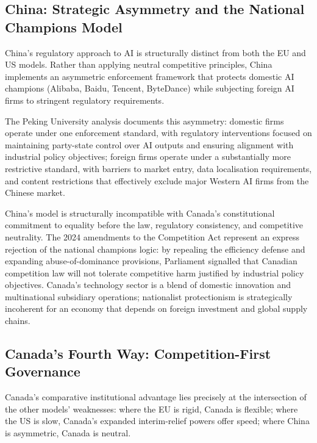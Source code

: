 \subsection{China: Strategic Asymmetry and the National Champions Model}

China's regulatory approach to AI is structurally distinct from both the EU and US models. Rather than applying neutral competitive principles, China implements an asymmetric enforcement framework that protects domestic AI champions (Alibaba, Baidu, Tencent, ByteDance) while subjecting foreign AI firms to stringent regulatory requirements.

The Peking University analysis documents this asymmetry: domestic firms operate under one enforcement standard, with regulatory interventions focused on maintaining party-state control over AI outputs and ensuring alignment with industrial policy objectives; foreign firms operate under a substantially more restrictive standard, with barriers to market entry, data localisation requirements, and content restrictions that effectively exclude major Western AI firms from the Chinese market.

China's model is structurally incompatible with Canada's constitutional commitment to equality before the law, regulatory consistency, and competitive neutrality. The 2024 amendments to the Competition Act represent an express rejection of the national champions logic: by repealing the efficiency defense and expanding abuse-of-dominance provisions, Parliament signalled that Canadian competition law will not tolerate competitive harm justified by industrial policy objectives. Canada's technology sector is a blend of domestic innovation and multinational subsidiary operations; nationalist protectionism is strategically incoherent for an economy that depends on foreign investment and global supply chains.

\subsection{Canada's Fourth Way: Competition-First Governance}

Canada's comparative institutional advantage lies precisely at the intersection of the other models' weaknesses: where the EU is rigid, Canada is flexible; where the US is slow, Canada's expanded interim-relief powers offer speed; where China is asymmetric, Canada is neutral.

